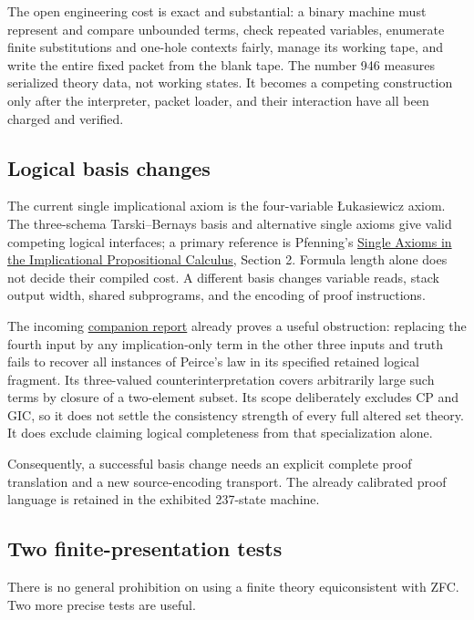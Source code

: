 The open engineering cost is exact and substantial: a binary machine
must represent and compare unbounded terms, check repeated variables,
enumerate finite substitutions and one-hole contexts fairly, manage its
working tape, and write the entire fixed packet from the blank tape.
The number 946 measures serialized theory data, not working states.
It becomes a competing construction only after the interpreter, packet
loader, and their interaction have all been charged and verified.

\subsection{Logical basis changes}

The current single implicational axiom is the four-variable
\L ukasiewicz axiom.  The three-schema Tarski--Bernays basis and alternative
single axioms give valid competing logical interfaces; a primary reference
is Pfenning's
\href{https://www.cs.cmu.edu/~fp/papers/cade88.pdf}
{Single Axioms in the Implicational Propositional Calculus}, Section 2.
Formula length alone does not decide their compiled cost.  A different
basis changes variable reads, stack output width, shared subprograms, and
the encoding of proof instructions.

The incoming
\href{https://github.com/VladimirReshetnikov/ProveIt/blob/ce192939372ac7944fe2a0208c68a96d49fb5e3b/docs/incoming/ZFC239_Companion_2026-10-19.zip}
{companion report} already proves a useful obstruction: replacing the
fourth input by any implication-only term in the other three inputs and
truth fails to recover all instances of Peirce's law in its specified
retained logical fragment.  Its three-valued counterinterpretation covers
arbitrarily large such terms by closure of a two-element subset.  Its
scope deliberately excludes CP and GIC, so it does not settle the
consistency strength of every full altered set theory.  It does exclude
claiming logical completeness from that specialization alone.

Consequently, a successful basis change needs an explicit complete
proof translation and a new source-encoding transport.  The already
calibrated proof language is retained in the exhibited 237-state machine.

\subsection{Two finite-presentation tests}

There is no general prohibition on using a finite theory equiconsistent
with ZFC.  Two more precise tests are useful.

